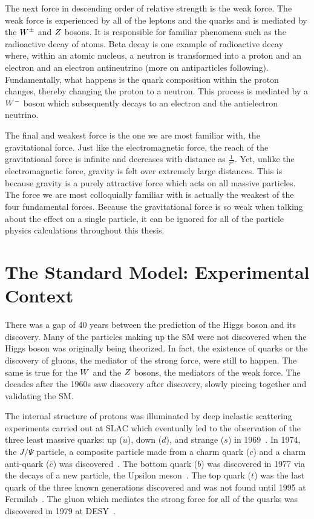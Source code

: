 The next force in descending order of relative strength is the weak force.
The weak force is experienced by
all of the leptons and the quarks and is mediated by the $W^{\pm}$ and $Z$ 
bosons. It is responsible for familiar phenomena such as the radioactive decay of atoms. 
Beta decay is one example of radioactive decay where, within an atomic nucleus,
a neutron is transformed into a proton and an electron and an electron antineutrino
(more on antiparticles following). Fundamentally, what happens
is the quark composition within the proton changes, thereby changing the proton to a
neutron. This process is mediated by a $W^{-}$ boson which subsequently decays
to an electron and the antielectron neutrino.

The final and weakest force is the one we are most familiar with, the gravitational
force. Just like the electromagnetic force, the reach of the gravitational force 
is infinite and decreases with distance as $\frac{1}{r^{2}}$. Yet, unlike the
electromagnetic force, gravity is felt over extremely large distances. This is because
gravity is a purely attractive force which acts on all massive particles.
The force we are most colloquially familiar with is actually the
weakest of the four fundamental forces. Because the gravitational force is so weak
when talking about the effect on a single particle, it can be ignored for
all of the particle physics calculations throughout this thesis.



\section{The Standard Model: Experimental Context}
There was a gap of 40 years between the prediction of the Higgs boson and its discovery.
Many of the particles making up the SM were not discovered when the Higgs boson
was originally being theorized. In fact, the existence of quarks or the discovery 
of gluons, the mediator of the strong force, were still to happen. The same is true
for the $W$ and the $Z$ bosons, the mediators of the weak force. The decades after the
1960s saw discovery after discovery, slowly piecing together and validating
the SM.

The internal structure of protons was illuminated by
deep inelastic scattering experiments carried out at SLAC which eventually led to 
the observation of the three least massive quarks: up ($u$), down ($d$), and strange ($s$)
in 1969~\cite{PhysRevLett.23.930,Breidenbach:1969kd}. In 1974, the $J/\Psi$ particle, a composite 
particle made from a charm quark ($c$) and a charm anti-quark ($\bar{c}$) was 
discovered~\cite{PhysRevLett.33.1404,PhysRevLett.33.1406}. 
The bottom quark ($b$) was discovered in 1977 via the decays of a new particle, the Upsilon
meson~\cite{PhysRevLett.39.252}. The top quark ($t$) was the last quark of the three
known generations discovered
and was not found until 1995 at Fermilab~\cite{PhysRevLett.74.2626,PhysRevLett.74.2632}.
The gluon which mediates the strong force for all of the quarks was discovered in 
1979 at DESY~\cite{PhysRevLett.43.830}.

